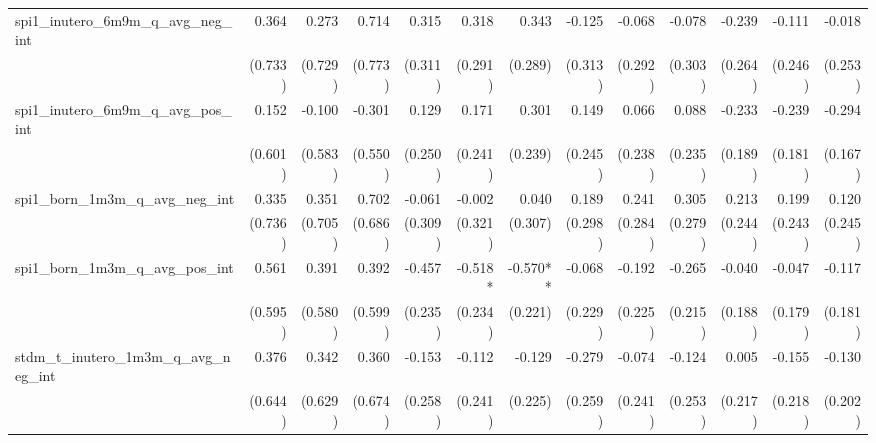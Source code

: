 \begin{tabular}{lrrrrrrrrrrrr}
spi1\_inutero\_6m9m\_q\_avg\_neg\_int       &        0.364 &        0.273 &        0.714 &        0.315 &        0.318 &        0.343 &       -0.125 &       -0.068 &       -0.078 &       -0.239 &       -0.111 &       -0.018 \\ 
                                            &      (0.733) &      (0.729) &      (0.773) &      (0.311) &      (0.291) &      (0.289) &      (0.313) &      (0.292) &      (0.303) &      (0.264) &      (0.246) &      (0.253) \\ 
spi1\_inutero\_6m9m\_q\_avg\_pos\_int       &        0.152 &       -0.100 &       -0.301 &        0.129 &        0.171 &        0.301 &        0.149 &        0.066 &        0.088 &       -0.233 &       -0.239 &       -0.294 \\ 
                                            &      (0.601) &      (0.583) &      (0.550) &      (0.250) &      (0.241) &      (0.239) &      (0.245) &      (0.238) &      (0.235) &      (0.189) &      (0.181) &      (0.167) \\ 
spi1\_born\_1m3m\_q\_avg\_neg\_int          &        0.335 &        0.351 &        0.702 &       -0.061 &       -0.002 &        0.040 &        0.189 &        0.241 &        0.305 &        0.213 &        0.199 &        0.120 \\ 
                                            &      (0.736) &      (0.705) &      (0.686) &      (0.309) &      (0.321) &      (0.307) &      (0.298) &      (0.284) &      (0.279) &      (0.244) &      (0.243) &      (0.245) \\ 
spi1\_born\_1m3m\_q\_avg\_pos\_int          &        0.561 &        0.391 &        0.392 &       -0.457 &      -0.518* &     -0.570** &       -0.068 &       -0.192 &       -0.265 &       -0.040 &       -0.047 &       -0.117 \\ 
                                            &      (0.595) &      (0.580) &      (0.599) &      (0.235) &      (0.234) &      (0.221) &      (0.229) &      (0.225) &      (0.215) &      (0.188) &      (0.179) &      (0.181) \\ 
stdm\_t\_inutero\_1m3m\_q\_avg\_neg\_int    &        0.376 &        0.342 &        0.360 &       -0.153 &       -0.112 &       -0.129 &       -0.279 &       -0.074 &       -0.124 &        0.005 &       -0.155 &       -0.130 \\ 
                                            &      (0.644) &      (0.629) &      (0.674) &      (0.258) &      (0.241) &      (0.225) &      (0.259) &      (0.241) &      (0.253) &      (0.217) &      (0.218) &      (0.202) \\ 

\end{tabular}
